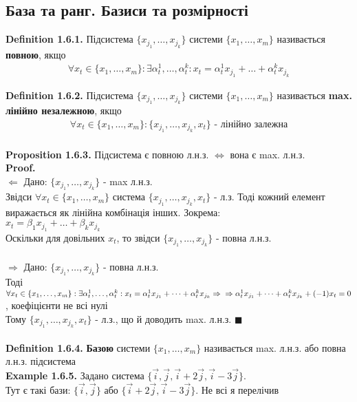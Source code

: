 \documentclass[a4paper, 14pt]{extarticle}
\def\defin#1{\textbf{Definition {#1}}}
\def\ex#1{\textbf{Example {#1}}}
\def\prp#1{\textbf{Proposition {#1}}}
\def\proof{\textbf{Proof.}\\}
\def\bigline{\vspace{5mm}\\}
\def\qed{$\blacksquare$}
\begin{document}
	\subsection{База та ранг. Базиси та розмірності}
	\defin{1.6.1.} Підсистема $\{x_{j_1}, \dots, x_{j_k}\}$ системи $\{x_1, \dots, x_m\}$ називається \textbf{повною}, якщо
	\begin{align*}
	\forall x_t \in \{x_1, \dots, x_m\}: \exists \alpha^1_t, \dots, \alpha^k_t: x_t = \alpha^1_t x_{j_1} + \dots + \alpha^k_t x_{j_k}
	\end{align*}
	
	\defin{1.6.2.} Підсистема $\{x_{j_1}, \dots, x_{j_k}\}$ системи $\{x_1, \dots, x_m\}$ називається \textbf{max. лінійно незалежною}, якщо
	\begin{align*}
	\forall x_t \in \{x_1, \dots, x_m\}: \{x_{j_1}, \dots, x_{j_k}, x_t\} \textrm{ - лінійно залежна}
	\end{align*}
	\\
	\prp{1.6.3.} Підсистема є повною л.н.з. $\iff$ вона є max. л.н.з.\\
	\proof
	$\boxed{\Leftarrow}$ Дано: $\{x_{j_1}, \dots, x_{j_k}\}$ - max л.н.з.\\
	Звідси $\forall x_t \in \{x_1, \dots, x_m \}$ система $\{x_{j_1}, \dots, x_{j_k}, x_t\}$ - л.з. Тоді кожний елемент виражається як лінійна комбінація інших. Зокрема:\\
	$x_t = \beta_1 x_{j_1} + \dots + \beta_k x_{j_k}$\\
	Оскільки для довільних $x_t$, то звідси $\{x_{j_1},\dots, x_{j_k}\}$ - повна л.н.з.\\
	\\
	$\boxed{\Rightarrow}$ Дано: $\{x_{j_1}, \dots, x_{j_k}\}$ - повна л.н.з.\\
	Тоді $\forall x_t \in \{x_1, \dots, x_m\}: \exists \alpha^1_t, \dots, \alpha^k_t: x_t = \alpha^1_t x_{j_1} + \dots + \alpha^k_t x_{j_k} \Rightarrow \\
	\Rightarrow \alpha^1_t x_{j_1} + \dots + \alpha^k_t x_{j_k} + (-1)x_t = 0$, коефіцієнти не всі нулі\\
	Тому $\{x_{j_1}, \dots, x_{j_k}, x_t\}$ - л.з., що й доводить max. л.н.з. \qed
	\\
	\bigline
	\defin{1.6.4.} \textbf{Базою} системи $\{x_1, \dots, x_m\}$ називається max. л.н.з. або повна л.н.з. підсистема
	\bigline
	\ex{1.6.5.} Задано система $\{\vec{i}, \vec{j}, \vec{i}+2\vec{j}, \vec{i}-3\vec{j} \}$.\\
	Тут є такі бази: $\{\vec{i},\vec{j}\}$ або $\{\vec{i}+2\vec{j},\vec{i}-3\vec{j}\}$. Не всі я перелічив\\
\end{document}

